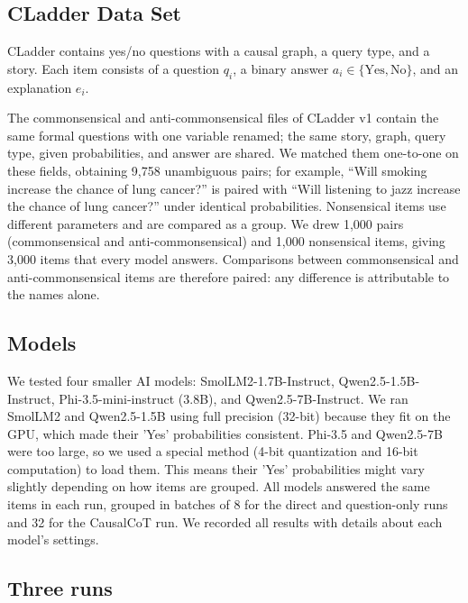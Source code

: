 \documentclass{llncs}
\begin{document}
\subsection{CLadder Data Set}
\label{sec:sampling}

CLadder \cite{jin2023cladder} contains yes/no questions with a causal graph, a query type, and a story. Each item consists of a question $q_i$, a binary answer $a_i \in \{\text{Yes},\text{No}\}$, and an explanation $e_i$. 

The commonsensical and anti-commonsensical files of CLadder v1 contain the same formal questions with one variable renamed; the same story, graph, query type, given probabilities, and answer are shared. We matched them one-to-one on these fields, obtaining 9,758 unambiguous pairs; for example, ``Will smoking increase the chance of lung cancer?'' is paired with ``Will listening to jazz increase the chance of lung cancer?'' under identical probabilities. Nonsensical items use different parameters and are compared as a group. We drew 1,000 pairs (commonsensical and anti-commonsensical) and 1,000 nonsensical items, giving 3,000 items that every model answers. Comparisons between commonsensical and anti-commonsensical items are therefore paired: any difference is attributable to the names alone.

\subsection{Models}
\label{sec:models}

We tested four smaller AI models: SmolLM2-1.7B-Instruct, Qwen2.5-1.5B-Instruct, Phi-3.5-mini-instruct (3.8B), and Qwen2.5-7B-Instruct. We ran SmolLM2 and Qwen2.5-1.5B using full precision (32-bit) because they fit on the GPU, which made their 'Yes' probabilities consistent. Phi-3.5 and Qwen2.5-7B were too large, so we used a special method (4-bit quantization and 16-bit computation) to load them. This means their 'Yes' probabilities might vary slightly depending on how items are grouped. All models answered the same items in each run, grouped in batches of 8 for the direct and question-only runs and 32 for the CausalCoT run. We recorded all results with details about each model's settings.

\subsection{Three runs}
\label{sec:runs}
\end{document}
